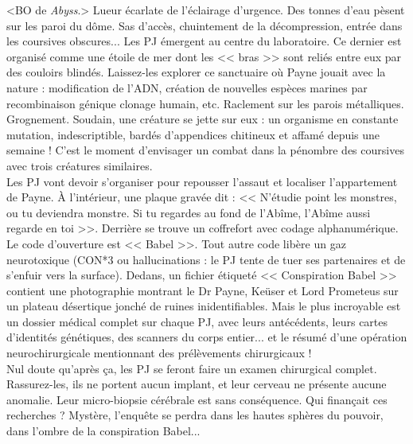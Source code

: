 \documentclass[11pt,twoside,a4paper]{book}
\begin{document}
<BO de \emph{Abyss}.> Lueur {\'e}carlate de l'{\'e}clairage d'urgence. Des tonnes d'eau p{\`e}sent sur les paroi du d{\^o}me. Sas d'acc{\`e}s, chuintement de la d{\'e}compression, entr{\'e}e dans les coursives obscures... Les PJ {\'e}mergent au centre du laboratoire. Ce dernier est organis{\'e} comme une {\'e}toile de mer dont les << bras >> sont reli{\'e}s entre eux par des couloirs blind{\'e}s. Laissez-les explorer ce sanctuaire o{\`u} Payne jouait avec la nature : modification de l'ADN, cr{\'e}ation de nouvelles esp{\`e}ces marines par recombinaison g{\'e}nique clonage humain, etc. Raclement sur les parois m{\'e}talliques. Grognement. Soudain, une cr{\'e}ature se jette sur eux : un organisme en constante mutation, indescriptible, bard{\'e}s d'appendices chitineux et affam{\'e} depuis une semaine ! C'est le moment d'envisager un combat dans la p{\'e}nombre des coursives avec trois cr{\'e}atures similaires. ~\\

Les PJ vont devoir s'organiser pour repousser l'assaut et localiser l'appartement de Payne. {\`A} l'int{\'e}rieur, une plaque grav{\'e}e dit : << N'{\'e}tudie point les monstres, ou tu deviendra monstre. Si tu regardes au fond de l'Ab{\^i}me, l'Ab{\^i}me aussi regarde en toi >>. Derri{\`e}re se trouve un coffrefort avec codage alphanum{\'e}rique. Le code d'ouverture est << Babel >>. Tout autre code lib{\`e}re un gaz neurotoxique (CON*3 ou hallucinations : le PJ tente de tuer ses partenaires et de s'enfuir vers la surface). Dedans, un fichier {\'e}tiquet{\'e} << Conspiration Babel >> contient une photographie montrant le Dr Payne, Ke{\"u}ser et Lord Prometeus sur un plateau d{\'e}sertique jonch{\'e} de ruines inidentifiables. Mais le plus incroyable est un dossier m{\'e}dical complet sur chaque PJ, avec leurs ant{\'e}c{\'e}dents, leurs cartes d'identit{\'e}s g{\'e}n{\'e}tiques, des scanners du corps entier... et le r{\'e}sum{\'e} d'une op{\'e}ration neurochirurgicale mentionnant des pr{\'e}l{\`e}vements chirurgicaux !~\\

Nul doute qu'apr{\`e}s \c{c}a, les PJ se feront faire un examen chirurgical complet. Rassurez-les, ils ne portent aucun implant, et leur cerveau ne pr{\'e}sente aucune anomalie. Leur micro-biopsie c{\'e}r{\'e}brale est sans cons{\'e}quence. Qui finan\c{c}ait ces recherches ? Myst{\`e}re, l'enqu{\^e}te se perdra dans les hautes sph{\`e}res du pouvoir, dans l'ombre de la conspiration Babel...~\\
\end{document}
